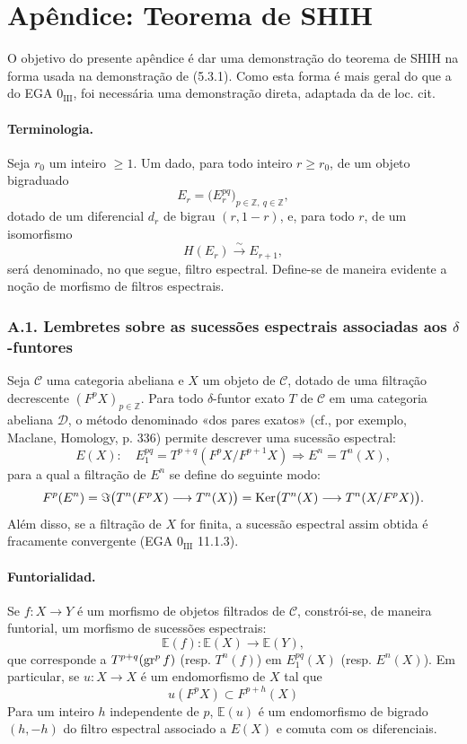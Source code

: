 \section*{Apêndice: Teorema de SHIH}

O objetivo do presente apêndice é dar uma demonstração do teorema de SHIH na forma usada na demonstração de (5.3.1). Como esta forma é mais geral do que a do EGA \(0_{\mathrm{III}}\), foi necessária uma demonstração direta, adaptada da de loc. cit.

\paragraph{Terminologia.}
Seja \(r_0\) um inteiro \(\ge1\). Um dado, para todo inteiro \(r\ge r_0\), de um objeto bigraduado
\[
E_r=\bigl(E_r^{pq}\bigr)_{p\in\mathbb Z,\ q\in\mathbb Z},
\]
dotado de um diferencial \(d_r\) de bigrau \((r,1-r)\), e, para todo \(r\), de um isomorfismo
\[
H(E_r)\xrightarrow{\sim}E_{r+1},
\]
será denominado, no que segue, filtro espectral. Define-se de maneira evidente a noção de morfismo de filtros espectrais.

\subsubsection*{A.1. Lembretes sobre as sucessões espectrais associadas aos \(\delta\)-funtores}

Seja \(\mathcal C\) uma categoria abeliana e \(X\) um objeto de \(\mathcal C\), dotado de uma filtração decrescente \((F^pX)_{p\in\mathbb Z}\). Para todo \(\delta\)-funtor exato \(T\) de \(\mathcal C\) em uma categoria abeliana \(\mathcal D\), o método denominado «dos pares exatos» (cf., por exemplo, Maclane, Homology, p. 336) permite descrever uma sucessão espectral:
\[
E(X):\quad E_1^{pq}=T^{p+q}(F^pX/F^{p+1}X)\Rightarrow E^n=T^n(X),
\]
para a qual a filtração de \(E^n\) se define do seguinte modo:
\[
F^p(E^n)=\Im\bigl(T^n(F^pX)\longrightarrow T^n(X)\bigr)
=\operatorname{Ker}\bigl(T^n(X)\longrightarrow T^n(X/F^pX)\bigr).
\]
Além disso, se a filtração de \(X\) for finita, a sucessão espectral assim obtida é fracamente convergente (EGA \(0_{\mathrm{III}}\) 11.1.3).

\paragraph{Funtorialidad.}
Se \(f:X\to Y\) é um morfismo de objetos filtrados de \(\mathcal C\), constrói-se, de maneira funtorial, um morfismo de sucessões espectrais:
\[
\mathbb E(f):\mathbb E(X)\longrightarrow \mathbb E(Y),
\]
que corresponde a \(T^{p+q}(\operatorname{gr}^p f)\) (resp. \(T^n(f)\)) em \(E_1^{pq}(X)\) (resp. \(E^n(X)\)). Em particular, se \(u:X\to X\) é um endomorfismo de \(X\) tal que
\[
u(F^pX)\subset F^{p+h}(X)
\]
Para um inteiro \(h\) independente de \(p\), \(\mathbb E(u)\) é um endomorfismo de bigrado \((h,-h)\) do filtro espectral associado a \(E(X)\) e comuta com os diferenciais.
